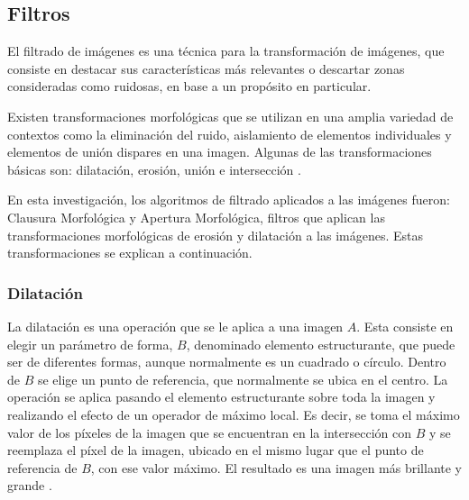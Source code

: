 \subsection{Filtros}\label{sec:filtros}
El filtrado de imágenes es una técnica para la transformación de imágenes, que consiste en destacar  sus características más relevantes o descartar zonas consideradas como ruidosas, en base a un propósito en particular. 

Existen transformaciones morfológicas que se utilizan en una amplia variedad de contextos como la eliminación del ruido, aislamiento de elementos individuales y elementos de unión dispares en una imagen. Algunas de las transformaciones básicas son: dilatación, erosión, uni\'on e intersecci\'on \cite{BookOpenCv}.

En esta investigación, los algoritmos de filtrado aplicados a las imágenes fueron: Clausura Morfológica y Apertura Morfológica, filtros que aplican las transformaciones morfológicas de erosión y dilatación a las imágenes. Estas transformaciones se explican a continuación.

 

\subsubsection{Dilatación}

La dilatación es una operación que se le aplica a una imagen $A$. Esta consiste en elegir un parámetro de forma, $B$, denominado elemento estructurante, que puede ser de diferentes formas, aunque normalmente es un cuadrado o círculo. Dentro de $B$ se elige un punto de referencia, que normalmente se ubica en el centro. La operación se aplica pasando el elemento estructurante sobre toda la imagen y realizando el efecto de un operador de máximo local. Es decir, se toma el m\'aximo valor de los píxeles de la imagen que se encuentran en la intersección con $B$ y se reemplaza el píxel de la imagen, ubicado en el mismo lugar que el punto de referencia de $B$, con ese valor máximo. El resultado es una imagen más brillante  y grande \cite{BookOpenCv}. 

